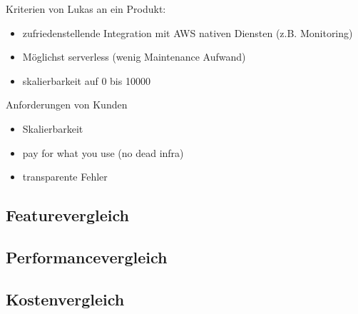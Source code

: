 Kriterien von Lukas an ein Produkt:
\begin{itemize}
\item zufriedenstellende Integration mit AWS nativen Diensten (z.B. Monitoring)
\item Möglichst serverless (wenig Maintenance Aufwand)
\item skalierbarkeit auf 0 bis 10000
\end{itemize}

Anforderungen von Kunden
\begin{itemize}
\item Skalierbarkeit
\item pay for what you use (no dead infra)
\item transparente Fehler
\end{itemize}




\subsection{Featurevergleich}

\subsection{Performancevergleich}

\subsection{Kostenvergleich}